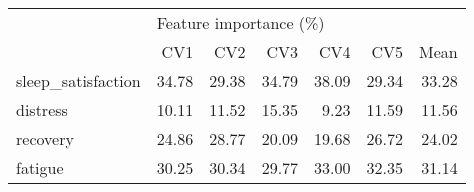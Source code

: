 \begin{tabular}{lrrrrrr}
\toprule
{} & \multicolumn{6}{l}{Feature importance (\%)} \\
{} &                    CV1 &    CV2 &    CV3 &    CV4 &    CV5 &   Mean \\
\midrule
sleep\_satisfaction &                  34.78 &  29.38 &  34.79 &  38.09 &  29.34 &  33.28 \\
distress           &                  10.11 &  11.52 &  15.35 &   9.23 &  11.59 &  11.56 \\
recovery           &                  24.86 &  28.77 &  20.09 &  19.68 &  26.72 &  24.02 \\
fatigue            &                  30.25 &  30.34 &  29.77 &  33.00 &  32.35 &  31.14 \\
\bottomrule
\end{tabular}
